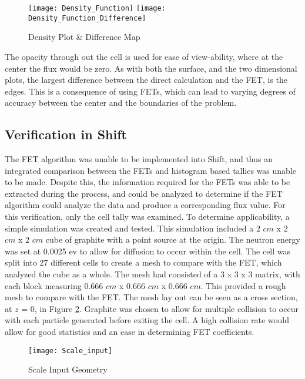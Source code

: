 \documentclass[10tma4paper]{article}
\begin{document}
\begin{figure}[H]
	\caption{Density Plot \& Difference Map}
	\begin{center}
		\texttt{[image: Density\_Function]}
		\texttt{[image: Density\_Function\_Difference]}
	\end{center}
	\label{Density Plot}
\end{figure}
The opacity through out the cell is used for ease of view-ability, where at the center the flux would be zero. As with both the surface, and the two dimensional plots, the largest difference between the direct calculation and the FET, is the edges. This is a consequence of using FETs, which can lead to varying degrees of accuracy between the center and the boundaries of the problem.

\subsection{Verification in Shift}\label{P2}
The FET algorithm was unable to be implemented into Shift, and thus an integrated comparison between the FETs and histogram based tallies was unable to be made. Despite this, the information required for the FETs was able to be extracted during the process, and could be analyzed to determine if the FET algorithm could analyze the data and produce a corresponding flux value. For this verification, only the cell tally was examined. To determine applicability, a simple simulation was created and tested. This simulation included a $2$ $cm$ x $2$ $cm$ x $2$ $cm$ cube of graphite with a point source at the origin. The neutron energy was set at 0.0025 ev to allow for diffusion to occur within the cell. The cell was split into 27 different cells to create a mesh to compare with the FET, which analyzed the cube as a whole. The mesh had consisted of a 3 x 3 x 3 matrix, with each block measuring $0.666$ $cm$ x $0.666$ $cm$ x $0.666$ $cm$. This provided a rough mesh to compare with the FET. The mesh lay out can be seen as a cross section, at $z$ = 0, in Figure \ref{ScaleRef}. Graphite was chosen to allow for multiple collision to occur with each particle generated before exiting the cell. A high collision rate would allow for good statistics and an ease in determining FET coefficients. 
\begin{figure}[!htbp]
	\caption{Scale Input Geometry}
	\begin{center}
		\texttt{[image: Scale\_input]}
	\end{center}
	\label{ScaleRef}
\end{figure}
\end{document}
